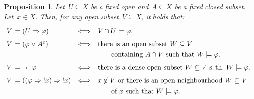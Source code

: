 \documentclass[10pt]{amsart}
\theoremstyle{definition}
\theoremstyle{plain}
\newtheorem{prop}[defn]{Proposition}
\theoremstyle{remark}
\newcommand{\?}{\,{:}\,}
\renewcommand{\_}{\mathpunct{.}\,}
\newcommand{\notat}[1]{{!#1}}
\begin{document}
\begin{prop}\label{prop:modops-kripke}
Let~$U \subseteq X$ be a fixed open and~$A \subseteq X$ be a fixed
closed subset. Let~$x \in X$. Then, for any open subset~$V \subseteq X$, it
holds that:
\[ \renewcommand{\arraystretch}{1.3}\begin{array}{@{}lcl@{}}
  V \models (U \Rightarrow \varphi) &\Longleftrightarrow&
    V \cap U \models \varphi. \\[0.3em]
  V \models (\varphi \vee A^c) &\Longleftrightarrow&
    \textnormal{there is an open subset~$W \subseteq V$} \\
  && \quad\quad \textnormal{containing~$A \cap V$ such that $W \models \varphi$.} \\[0.3em]
  V \models \neg\neg\varphi &\Longleftrightarrow&
    \textnormal{there is a dense open subset~$W \subseteq V$ s.\,th.\@ $W \models
    \varphi$.} \\[0.3em]
  V \models ((\varphi \Rightarrow \notat{x}) \Rightarrow \notat{x}) &\Longleftrightarrow&
    \textnormal{$x \not\in V$ or there is an open neighbourhood~$W \subseteq V$} \\
  && \quad\quad \textnormal{of~$x$ such that $W \models \varphi$.}
\end{array} \]
\end{prop}
\end{document}
